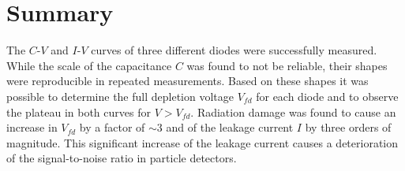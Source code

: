 \documentclass[11pt]{report}
\begin{document}
\section*{Summary}
\label{sec:summary}

The $C$-$V$ and $I$-$V$ curves of three different diodes were successfully measured.
While the scale of the capacitance $C$ was found to not be reliable, their shapes were reproducible in repeated measurements.
Based on these shapes it was possible to determine the full depletion voltage $V_{fd}$ for each diode and to observe the plateau in both curves for $V>V_{fd}$.
Radiation damage was found to cause an increase in $V_{fd}$ by a factor of $\sim 3$ and of the leakage current $I$ by three orders of magnitude.
This significant increase of the leakage current causes a deterioration of the signal-to-noise ratio in particle detectors.

\printbibliography
\end{document}
